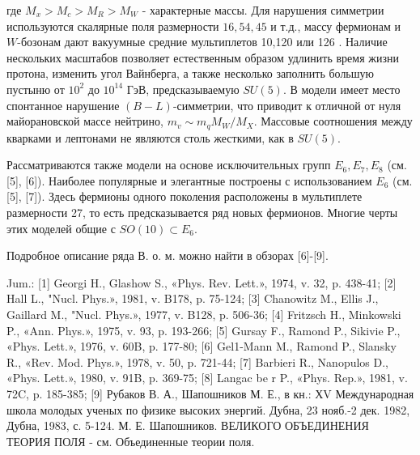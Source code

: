 \documentclass[10pt]{article}
\begin{document}
где $M_{x}>M_{c}>M_{R}>M_{W}$ - характерные массы. Для нарушения симметрии используются скалярные поля размерности $16,54,45$ и т.д., массу фермионам и $W$-бозонам дают вакуумные средние мультиплетов 10,120 или 126 . Наличие нескольких масштабов позволяет естественным образом удлинить время жизни протона, изменить угол Вайнберга, а также несколько заполнить большую пустыню от $10^{2}$ до $10^{14}$ ГэВ, предсказываемую $S U(5)$. В модели имеет место спонтанное нарушение $(B-L)$-симметрии, что приводит к отличной от нуля майорановской массе нейтрино, $m_{v} \sim m_{q} M_{W} / M_{X}$. Массовые соотношения между кварками и лептонами не являются столь жесткими, как в $S U(5)$.



Рассматриваются также модели на основе исключительных групп $E_{6}, E_{7}, E_{8}$ (см. [5], [6]). Наиболее популярные и элегантные построены с использованием $E_{6}$ (см. [5], [7]). Здесь фермионы одного поколения расположены в мультиплете размерности 27, то есть предсказывается ряд новых фермионов. Многие черты этих моделей общие с $S O(10) \subset E_{6}$.



Подробное описание ряда В. о. м. можно найти в обзорах [6]-[9].



Jum.: [1] Georgi H., Glashow S., «Phys. Rev. Lett.», 1974, v. 32, p. 438-41; [2] Hall L., "Nucl. Phys.», 1981, v. B178, p. 75-124; [3] Chanowitz M., Ellis J., Gaillard M., "Nucl. Phys.», 1977, v. B128, p. 506-36; [4] Fritzsch H., Minkowski P., «Ann. Phys.», 1975, v. 93, p. 193-266; [5] Gursay F., Ramond P., Sikivie P., «Phys. Lett.», 1976, v. 60B, p. 177-80; [6] Gel1-Mann M., Ramond P., Slansky R., «Rev. Mod. Phys.», 1978, v. 50, p. 721-44; [7] Barbieri R., Nanopulos D., «Phys. Lett.», 1980, v. 91B, p. 369-75; [8] Langac be r P., «Phys. Rep.», 1981, v. 72C, p. 185-385; [9] Рубаков В. А., Шапошников М. Е., в кн.: ХV Международная школа молодых ученых по физике высоких энергий. Дубна, 23 нояб.-2 дек. 1982, Дубна, 1983, с. 5-124. М. Е. Шапошников. ВЕЛИКОГО ОБЪЕДИНЕНИЯ ТЕОРИЯ ПОЛЯ - см. Объединенные теории поля.
\end{document}
